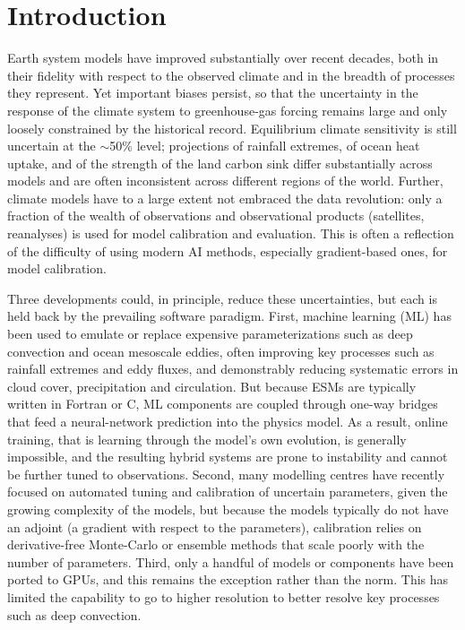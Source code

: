 \documentclass[11pt]{article}
\begin{document}
\vspace{0.4em}
\linenumbers

\section*{Introduction}
Earth system models have improved substantially over recent decades, both in their fidelity with
respect to the observed climate and in the breadth of processes they represent\cite{Eyring2016,IPCC2021}.
Yet important biases persist, so that the uncertainty in the response of the climate system to
greenhouse-gas forcing remains large and only loosely constrained by the historical record.
Equilibrium climate sensitivity is still uncertain at the $\sim$50\% level\cite{Sherwood2020};
projections of rainfall extremes\cite{OGorman2015}, of ocean heat uptake, and of the strength of
the land carbon sink\cite{Arora2020,Friedlingstein2022} differ substantially across models and are
often inconsistent across different regions of the world. Further, climate models have to a large
extent not embraced the data revolution: only a fraction of the wealth of observations and
observational products (satellites, reanalyses) is used for model calibration and evaluation. This
is often a reflection of the difficulty of using modern AI methods, especially gradient-based ones,
for model calibration.

Three developments could, in principle, reduce these uncertainties, but each is held back by the
prevailing software paradigm. First, machine learning (ML) has been used to emulate or replace
expensive parameterizations such as deep convection\cite{Gentine2018,Rasp2018,BrenowitzBretherton2018,YuvalOGorman2020}
and ocean mesoscale eddies\cite{BoltonZanna2019,ZannaBolton2020}, often improving key processes such
as rainfall extremes and eddy fluxes, and demonstrably reducing systematic errors in cloud cover,
precipitation and circulation\cite{IglesiasSuarez2024,Grundner2025,Heuer2026}. But because ESMs are
typically written in Fortran or C, ML components are coupled through one-way bridges that feed a
neural-network prediction into the physics model\cite{Ott2020}. As a result, online training, that is
learning through the model's own evolution, is generally impossible, and the resulting hybrid systems
are prone to instability\cite{BrenowitzBretherton2018} and cannot be further tuned to observations.
Second, many modelling centres have recently focused on automated tuning and calibration of uncertain
parameters\cite{Hourdin2017,Bonnet2025,Grundner2025}, given the growing complexity of the models, but
because the models typically do not have an adjoint (a gradient with respect to the parameters),
calibration relies on derivative-free Monte-Carlo or ensemble methods\cite{Cleary2021,Couvreux2021,Schneider2017}
that scale poorly with the number of parameters. Third, only a handful of models or components have
been ported to GPUs\cite{Fuhrer2018,Bauer2021}, and this remains the exception rather than the norm.
This has limited the capability to go to higher resolution to better resolve key processes such as
deep convection\cite{Eyring2024}.
\end{document}
